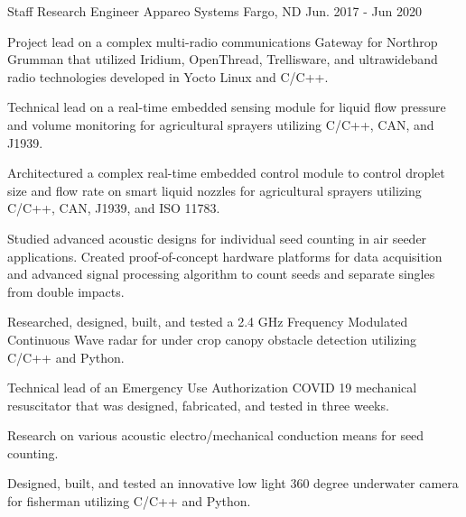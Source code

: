 \begin{cventries}
  \cventry
    {Staff Research Engineer} %
    {Appareo Systems} %
    {Fargo, ND} %
    {Jun. 2017 - Jun 2020} %
    {
      \begin{cvitems} %
        \item {Project lead on a complex multi-radio communications Gateway for Northrop Grumman that utilized Iridium, OpenThread, Trellisware, and ultrawideband radio technologies developed in Yocto Linux and C/C++.}
        \item {Technical lead on a real-time embedded sensing module for liquid flow pressure and volume monitoring for agricultural sprayers utilizing C/C++, CAN, and J1939.}
        \item {Architectured a complex real-time embedded control module to control droplet size and flow rate on smart liquid nozzles for agricultural sprayers utilizing C/C++, CAN, J1939, and ISO 11783.}
        \item {Studied advanced acoustic designs for individual seed counting in air seeder applications. Created proof-of-concept hardware platforms for data acquisition and advanced signal processing algorithm to count seeds and separate singles from double impacts.}
        \item {Researched, designed, built, and tested a 2.4 GHz Frequency Modulated Continuous Wave radar for under crop canopy obstacle detection utilizing C/C++ and Python.}
        \item {Technical lead of an Emergency Use Authorization COVID 19 mechanical resuscitator that was designed, fabricated, and tested in three weeks.}
        \item {Research on various acoustic electro/mechanical conduction means for seed counting.}
        \item {Designed, built, and tested an innovative low light 360 degree underwater camera for fisherman utilizing C/C++ and Python.}
      \end{cvitems}
    }


\end{cventries}

